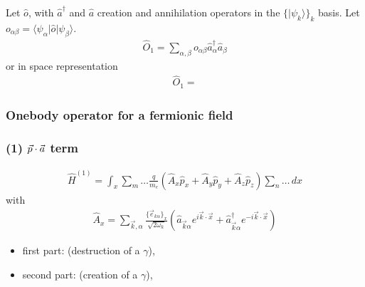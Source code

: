 \documentclass[letterpaper,10pt,english]{jupyterBook}
\begin{document}
\sphinxAtStartPar
Let \(\hat{o}\), with \(\hat{a}^\dagger\) and \(\hat{a}\) creation and annihilation operators in the \(\{ | \psi_k \rangle \}_k\) basis. Let \(o_{\alpha \beta} = \langle \psi_{\alpha} | \hat{o} | \psi_{\beta} \rangle\).
\begin{equation*}
\begin{split}\hat{O}_1 = \sum_{\alpha,\beta} o_{\alpha \beta} \hat{a}^\dagger_{\alpha} \hat{a}_{\beta}\end{split}
\end{equation*}
\sphinxAtStartPar
or in space representation
\begin{equation*}
\begin{split}\hat{O}_1 = \end{split}
\end{equation*}\subsubsection*{One\sphinxhyphen{}body operator for a fermionic field}
\subsubsection*{(1) \protect\(\vec p\cdot\vec a\protect\) term}
\begin{equation*}
\begin{split}
\hat H^{(1)}=\int_x\sum_m\dots\frac{q}{m_e}\left(\hat A_x\hat p_x+\hat A_y\hat p_y+\hat A_z\hat p_z\right)\sum_n\dots\,dx
\end{split}
\end{equation*}
\sphinxAtStartPar
with
\begin{equation*}
\begin{split}
\hat A_x=\sum_{\vec k,\alpha}\frac{\{\vec e_{k\alpha}\}_x}{\sqrt{2\omega_k}}\left(\hat a_{\vec k\alpha}e^{i\vec k\cdot\vec x}+\hat a^\dagger_{\vec k\alpha}e^{-i\vec k\cdot\vec x}\right)
\end{split}
\end{equation*}\begin{itemize}
\item {} 
\sphinxAtStartPar
first part:  (destruction of a \(\gamma\)),

\item {} 
\sphinxAtStartPar
second part:  (creation of a \(\gamma\)),

\end{itemize}
\end{document}
